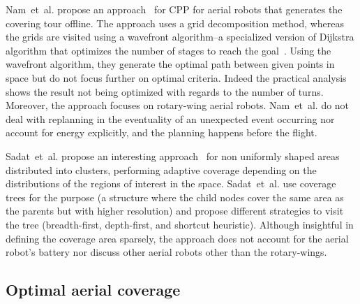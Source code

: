 Nam~et~al. propose an approach~\citep{nam2016approach} for CPP for aerial robots that generates the covering tour offline. The approach uses a grid decomposition method, whereas the grids are visited using a wavefront algorithm--a specialized version of Dijkstra algorithm that optimizes the number of stages to reach the goal~\citep{lavalle2006planning}. Using the wavefront algorithm, they generate the optimal path between given points in space but do not focus further on optimal criteria. Indeed the practical analysis shows the result not being optimized with regards to the number of turns. Moreover, the approach focuses on rotary-wing aerial robots. Nam~et~al. do not deal with replanning in the eventuality of an unexpected event occurring nor account for energy explicitly, and the planning happens before the flight.

Sadat~et~al. propose an interesting approach~\citep{sadat2014recursive} for non uniformly shaped areas distributed into clusters, performing adaptive coverage depending on the distributions of the regions of interest in the space. Sadat~et~al. use coverage trees for the purpose (a structure where the child nodes cover the same area as the parents but with higher resolution) and propose different strategies to visit the tree (breadth-first, depth-first, and shortcut heuristic). Although insightful in defining the coverage area sparsely, the approach does not account for the aerial robot's battery nor discuss other aerial robots other than the rotary-wings.

\subsection{Optimal aerial coverage}
\label{sec:opti-aero-cov}

